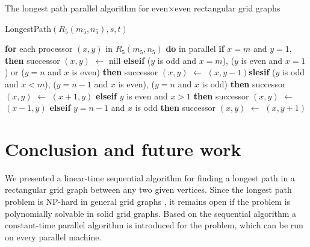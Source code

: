 \documentclass[preprint,12pt]{elsarticle}
\begin{document}
\begin{algorithm}
\caption{The longest path parallel algorithm for even$\times$even
rectangular grid graphs} \label{alg:4}
\begin{algorithmic}
\PROC LongestPath$(R_5(m_5,n_5),s,t)$
\end{algorithmic}
\begin{algorithmic}[1]
{\small \STATE \textbf{for} each processor $(x,y)$ in $R_5(m_5,n_5)$
\textbf{do} in parallel \STATE \textbf{if} $x=m$ and $y=1$,
\textbf{then} successor $(x,y)$ $\longleftarrow$ nill \STATE
\textbf{elseif} ($y$ is odd and $x=m$), ($y$ is even and $x=1$) or
($y=n$ and $x$ is even)  \textbf{then} successor $(x,y)$
$\longleftarrow$ $(x,y-1)$\STATE \textbf{slesif} ($y$ is odd and
$x<m$), ($y=n-1$ and $x$ is even), ($y=n$ and $x$ is odd)
\textbf{then} successor $(x,y)$ $\longleftarrow$ $(x+1,y)$
 \STATE \textbf{elseif} $y$ is even and $x>1$ \textbf{then} successor $(x,y)$ $\longleftarrow$ $(x-1,y)$
 \STATE \textbf{elseif} $y=n-1$ and $x$ is odd \textbf{then} successor $(x,y)$ $\longleftarrow$ $(x,y+1)$
 }

\end{algorithmic}
\end{algorithm}

\section{Conclusion and future work} \label{ConclusionSect}
We presented a linear-time sequential algorithm for finding a longest path in a
rectangular grid graph between any two given vertices. Since the
longest path problem is NP-hard in general grid graphs
\cite{IPS:HPIGG}, it remains open if the problem is polynomially
solvable in solid grid
graphs. Based on the sequential algorithm a constant-time parallel algorithm
is introduced for the problem, which can be run on every parallel machine.\\[1cm]
\end{document}

